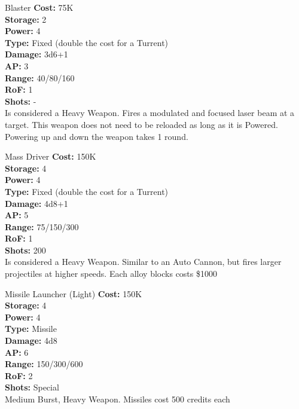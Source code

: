 \begin{multicols}{2}
\begin{genericsection}{Blaster}
\textbf{Cost:} 75K\\
\textbf{Storage:} 2\\
\textbf{Power:} 4\\
\textbf{Type:} Fixed (double the cost for a Turrent)\\
\textbf{Damage:} 3d6+1\\
\textbf{AP:} 3\\
\textbf{Range:} 40/80/160\\
\textbf{RoF:} 1\\
\textbf{Shots:} -\\
Is considered a Heavy Weapon. Fires a modulated and focused laser beam at a target. This weapon does not need to be reloaded as long as it is Powered. Powering up and down the weapon takes 1 round.
\end{genericsection}

\begin{genericsection}{Mass Driver}
\textbf{Cost:} 150K\\
\textbf{Storage:} 4\\
\textbf{Power:} 4\\
\textbf{Type:} Fixed (double the cost for a Turrent)\\
\textbf{Damage:} 4d8+1\\
\textbf{AP:} 5\\
\textbf{Range:} 75/150/300\\
\textbf{RoF:} 1\\
\textbf{Shots:} 200\\
Is considered a Heavy Weapon. Similar to an Auto Cannon, but fires larger projectiles at higher speeds. Each alloy blocks costs \$1000
\end{genericsection}

\begin{genericsection}{Missile Launcher (Light)}
\textbf{Cost:} 150K\\
\textbf{Storage:} 4\\
\textbf{Power:} 4\\
\textbf{Type:} Missile\\
\textbf{Damage:} 4d8\\
\textbf{AP:} 6\\
\textbf{Range:} 150/300/600\\
\textbf{RoF:} 2\\
\textbf{Shots:} Special\\
Medium Burst, Heavy Weapon. Missiles cost 500 credits each
\end{genericsection}


\end{multicols}
